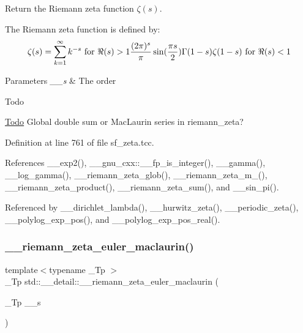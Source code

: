 Return the Riemann zeta function $ \zeta(s) $. 

The Riemann zeta function is defined by\+: \[ \zeta(s) = \sum_{k=1}^{\infty} k^{-s} \mbox{ for } \Re(s) > 1 \\ \frac{(2\pi)^s}{\pi} \sin(\frac{\pi s}{2}) \Gamma(1 - s) \zeta(1 - s) \mbox{ for } \Re(s) < 1 \]


\begin{DoxyParams}{Parameters}
{\em \+\_\+\+\_\+s} & The order \\
\hline
\end{DoxyParams}
\begin{DoxyRefDesc}{Todo}
\item[\hyperlink{todo__todo000017}{Todo}]Global double sum or Mac\+Laurin series in riemann\+\_\+zeta? \end{DoxyRefDesc}


Definition at line 761 of file sf\+\_\+zeta.\+tcc.



References \+\_\+\+\_\+exp2(), \+\_\+\+\_\+gnu\+\_\+cxx\+::\+\_\+\+\_\+fp\+\_\+is\+\_\+integer(), \+\_\+\+\_\+gamma(), \+\_\+\+\_\+log\+\_\+gamma(), \+\_\+\+\_\+riemann\+\_\+zeta\+\_\+glob(), \+\_\+\+\_\+riemann\+\_\+zeta\+\_\+m\+\_(), \+\_\+\+\_\+riemann\+\_\+zeta\+\_\+product(), \+\_\+\+\_\+riemann\+\_\+zeta\+\_\+sum(), and \+\_\+\+\_\+sin\+\_\+pi().



Referenced by \+\_\+\+\_\+dirichlet\+\_\+lambda(), \+\_\+\+\_\+hurwitz\+\_\+zeta(), \+\_\+\+\_\+periodic\+\_\+zeta(), \+\_\+\+\_\+polylog\+\_\+exp\+\_\+pos(), and \+\_\+\+\_\+polylog\+\_\+exp\+\_\+pos\+\_\+real().

\mbox{\label{namespacestd_1_1____detail_a84ac805996c4eeb8cbfa181e6e47f0ae}} 
\subsubsection{\texorpdfstring{\+\_\+\+\_\+riemann\+\_\+zeta\+\_\+euler\+\_\+maclaurin()}{\_\_riemann\_zeta\_euler\_maclaurin()}}
{\footnotesize\ttfamily template$<$typename \+\_\+\+Tp $>$ \\
\+\_\+\+Tp std\+::\+\_\+\+\_\+detail\+::\+\_\+\+\_\+riemann\+\_\+zeta\+\_\+euler\+\_\+maclaurin (\begin{DoxyParamCaption}\item[{\+\_\+\+Tp}]{\+\_\+\+\_\+s }\end{DoxyParamCaption})}



